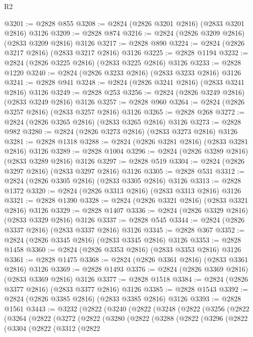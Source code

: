 \begin{lexlean}{R2}
\begin{coremodule}
@3201 := @2828 @855
@3208 := @2824 (@2826 @3201 @2816) (@2833 @3201 @2816) @3126
@3209 := @2828 @874
@3216 := @2824 (@2826 @3209 @2816) (@2833 @3209 @2816) @3126
@3217 := @2828 @890
@3224 := @2824 (@2826 @3217 @2816) (@2833 @3217 @2816) @3126
@3225 := @2828 @1194
@3232 := @2824 (@2826 @3225 @2816) (@2833 @3225 @2816) @3126
@3233 := @2828 @1220
@3240 := @2824 (@2826 @3233 @2816) (@2833 @3233 @2816) @3126
@3241 := @2828 @941
@3248 := @2824 (@2826 @3241 @2816) (@2833 @3241 @2816) @3126
@3249 := @2828 @253
@3256 := @2824 (@2826 @3249 @2816) (@2833 @3249 @2816) @3126
@3257 := @2828 @960
@3264 := @2824 (@2826 @3257 @2816) (@2833 @3257 @2816) @3126
@3265 := @2828 @268
@3272 := @2824 (@2826 @3265 @2816) (@2833 @3265 @2816) @3126
@3273 := @2828 @982
@3280 := @2824 (@2826 @3273 @2816) (@2833 @3273 @2816) @3126
@3281 := @2828 @1318
@3288 := @2824 (@2826 @3281 @2816) (@2833 @3281 @2816) @3126
@3289 := @2828 @1004
@3296 := @2824 (@2826 @3289 @2816) (@2833 @3289 @2816) @3126
@3297 := @2828 @519
@3304 := @2824 (@2826 @3297 @2816) (@2833 @3297 @2816) @3126
@3305 := @2828 @531
@3312 := @2824 (@2826 @3305 @2816) (@2833 @3305 @2816) @3126
@3313 := @2828 @1372
@3320 := @2824 (@2826 @3313 @2816) (@2833 @3313 @2816) @3126
@3321 := @2828 @1390
@3328 := @2824 (@2826 @3321 @2816) (@2833 @3321 @2816) @3126
@3329 := @2828 @1407
@3336 := @2824 (@2826 @3329 @2816) (@2833 @3329 @2816) @3126
@3337 := @2828 @545
@3344 := @2824 (@2826 @3337 @2816) (@2833 @3337 @2816) @3126
@3345 := @2828 @367
@3352 := @2824 (@2826 @3345 @2816) (@2833 @3345 @2816) @3126
@3353 := @2828 @1458
@3360 := @2824 (@2826 @3353 @2816) (@2833 @3353 @2816) @3126
@3361 := @2828 @1475
@3368 := @2824 (@2826 @3361 @2816) (@2833 @3361 @2816) @3126
@3369 := @2828 @1493
@3376 := @2824 (@2826 @3369 @2816) (@2833 @3369 @2816) @3126
@3377 := @2828 @1518
@3384 := @2824 (@2826 @3377 @2816) (@2833 @3377 @2816) @3126
@3385 := @2828 @1543
@3392 := @2824 (@2826 @3385 @2816) (@2833 @3385 @2816) @3126
@3393 := @2828 @1561
@3443 := @3232
    (@2822
      (@3240
        (@2822
          (@3248
            (@2822
              (@3256
                (@2822
                  (@3264
                    (@2822
                      (@3272
                        (@2822
                          (@3280
                            (@2822
                              (@3288
                                (@2822
                                  (@3296
                                    (@2822
                                      (@3304
                                        (@2822
                                          (@3312
                                            (@2822

\end{coremodule}
\end{lexlean}
